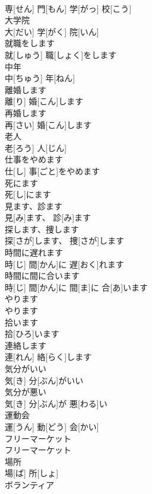 \documentclass[8pt]{extreport}
\begin{document}
\begin{CJK}{UTF8}{min}
\\	専[せん] 門[もん] 学[がっ] 校[こう]		
\\	大学院	
\\	大[だい] 学[がく] 院[いん]		
\\	就職をします	
\\	就[しゅう] 職[しょく]をします		
\\	中年	
\\	中[ちゅう] 年[ねん]		
\\	離婚します	
\\	離[り] 婚[こん]します		
\\	再婚します	
\\	再[さい] 婚[こん]します		
\\	老人	
\\	老[ろう] 人[じん]		
\\	仕事をやめます	
\\	仕[し] 事[ごと]をやめます		
\\	死にます	
\\	死[し]にます		
\\	見ます、診ます	
\\	見[み]ます、 診[み]ます		
\\	探します、捜します	
\\	探[さが]します、 捜[さが]します		
\\	時間に遅れます	
\\	時[じ] 間[かん]に 遅[おく]れます		
\\	時間に間に合います	
\\	時[じ] 間[かん]に 間[ま]に 合[あ]います		
\\	やります	
\\	やります		
\\	拾います	
\\	拾[ひろ]います		
\\	連絡します	
\\	連[れん] 絡[らく]します		
\\	気分がいい	
\\	気[き] 分[ぶん]がいい		
\\	気分が悪い	
\\	気[き] 分[ぶん]が 悪[わる]い		
\\	運動会	
\\	運[うん] 動[どう] 会[かい]		
\\	フリーマーケット	
\\	フリーマーケット		
\\	場所	
\\	場[ば] 所[しょ]		
\\	ボランティア	

\end{CJK}
\end{document}
